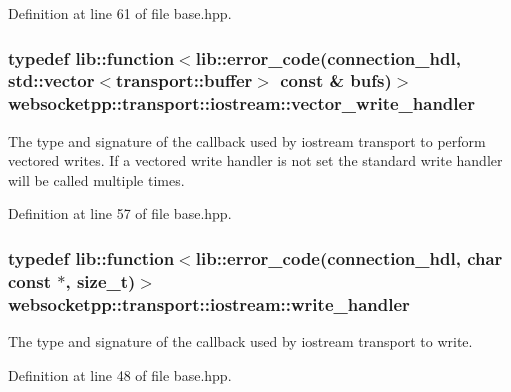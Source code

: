 Definition at line 61 of file base.\+hpp.

\hypertarget{namespacewebsocketpp_1_1transport_1_1iostream_a21982146513c0b5580786c3af5dd2878}{}
\subsubsection[{vector\+\_\+write\+\_\+handler}]{\setlength{\rightskip}{0pt plus 5cm}typedef lib\+::function$<$lib\+::error\+\_\+code({\bf connection\+\_\+hdl}, std\+::vector$<${\bf transport\+::buffer}$>$ const \& bufs)$>$ {\bf websocketpp\+::transport\+::iostream\+::vector\+\_\+write\+\_\+handler}}\label{namespacewebsocketpp_1_1transport_1_1iostream_a21982146513c0b5580786c3af5dd2878}
The type and signature of the callback used by iostream transport to perform vectored writes. If a vectored write handler is not set the standard write handler will be called multiple times. 

Definition at line 57 of file base.\+hpp.

\hypertarget{namespacewebsocketpp_1_1transport_1_1iostream_abc22b834c2d0c698d6c87e51d5bfad2c}{}
\subsubsection[{write\+\_\+handler}]{\setlength{\rightskip}{0pt plus 5cm}typedef lib\+::function$<$lib\+::error\+\_\+code({\bf connection\+\_\+hdl}, char const $\ast$, size\+\_\+t)$>$ {\bf websocketpp\+::transport\+::iostream\+::write\+\_\+handler}}\label{namespacewebsocketpp_1_1transport_1_1iostream_abc22b834c2d0c698d6c87e51d5bfad2c}


The type and signature of the callback used by iostream transport to write. 



Definition at line 48 of file base.\+hpp.

